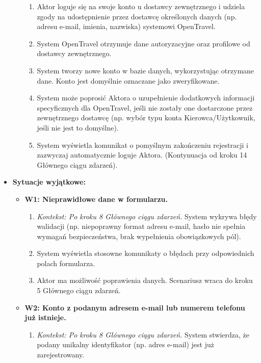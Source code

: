 \documentclass[a4paper,12pt]{article}
\begin{document}
\begin{itemize}
\begin{itemize}
\begin{enumerate}
                    \item Aktor loguje się na swoje konto u dostawcy zewnętrznego i udziela zgody na udostępnienie przez dostawcę określonych danych (np. adresu e-mail, imienia, nazwiska) systemowi OpenTravel.
                    \item System OpenTravel otrzymuje dane autoryzacyjne oraz profilowe od dostawcy zewnętrznego.
                    \item System tworzy nowe konto w bazie danych, wykorzystując otrzymane dane. Konto jest domyślnie oznaczane jako zweryfikowane.
                    \item System może poprosić Aktora o uzupełnienie dodatkowych informacji specyficznych dla OpenTravel, jeśli nie zostały one dostarczone przez zewnętrznego dostawcę (np. wybór typu konta Kierowca/Użytkownik, jeśli nie jest to domyślne).
                    \item System wyświetla komunikat o pomyślnym zakończeniu rejestracji i zazwyczaj automatycznie loguje Aktora. (Kontynuacja od kroku 14 Głównego ciągu zdarzeń).
                \end{enumerate}
        \end{itemize}
    \item \textbf{Sytuacje wyjątkowe:}
        \begin{itemize}
            \item \textbf{W1: Nieprawidłowe dane w formularzu.}
                \begin{enumerate}
                    \item \textit{Kontekst: Po kroku 8 Głównego ciągu zdarzeń.} System wykrywa błędy walidacji (np. niepoprawny format adresu e-mail, hasło nie spełnia wymagań bezpieczeństwa, brak wypełnienia obowiązkowych pól).
                    \item System wyświetla stosowne komunikaty o błędach przy odpowiednich polach formularza.
                    \item Aktor ma możliwość poprawienia danych. Scenariusz wraca do kroku 5 Głównego ciągu zdarzeń.
                \end{enumerate}
            \item \textbf{W2: Konto z podanym adresem e-mail lub numerem telefonu już istnieje.}
                \begin{enumerate}
                    \item \textit{Kontekst: Po kroku 8 Głównego ciągu zdarzeń.} System stwierdza, że podany unikalny identyfikator (np. adres e-mail) jest już zarejestrowany.

\end{enumerate}
\end{itemize}
\end{itemize}
\end{document}
